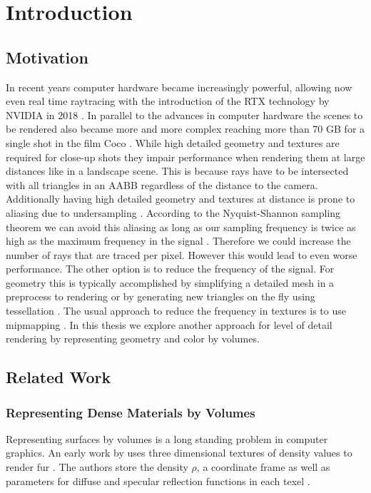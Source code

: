 \chapter{Introduction}
\label{chap:intro}

\section{Motivation}
\label{sect:motivation}
In recent years computer hardware became increasingly powerful, allowing now even real time raytracing with the introduction of the RTX technology by NVIDIA in 2018 \cite[pp. 31 - 38]{turing_whitepaper}.
In parallel to the advances in computer hardware the scenes to be rendered also became more and more complex reaching more than 70 GB for a single shot in the film Coco \cite{pixarxpu}.
While high detailed geometry and textures are required for close-up shots they impair performance when rendering them at large distances like in a landscape scene.
This is because rays have to be intersected with all triangles in an AABB regardless of the distance to the camera.
Additionally having high detailed geometry and textures at distance is prone to aliasing due to undersampling \cite[pp. 409-410]{pbr}.
According to the Nyquist-Shannon sampling theorem we can avoid this aliasing as long as our sampling frequency is twice as high as the maximum frequency in the signal \cite[p. 11]{shannonsampling}.
Therefore we could increase the number of rays that are traced per pixel.
However this would lead to even worse performance.
The other option is to reduce the frequency of the signal.
For geometry this is typically accomplished by simplifying a detailed mesh in a preprocess to rendering \cite[pp. 706 - 712]{realtime} or by generating new triangles on the fly using tessellation \cite[pp. 767 - 781]{realtime}.
The usual approach to reduce the frequency in textures is to use mipmapping \cite[pp. 265 - 267]{fundamentals}.
In this thesis we explore another approach for level of detail rendering by representing geometry and color by volumes.

\section{Related Work}
\subsection{Representing Dense Materials by Volumes}
Representing surfaces by volumes is a long standing problem in computer graphics.
An early work by \citeauthor{kajiya_rendering_fur_with_textures} uses three dimensional textures of density values to render fur \cite{kajiya_rendering_fur_with_textures}.
The authors store the density $\rho$, a coordinate frame as well as parameters for diffuse and specular reflection functions in each texel \cite[p. 2-3]{kajiya_rendering_fur_with_textures}.

